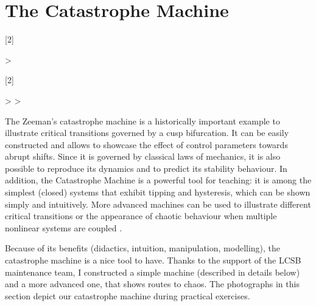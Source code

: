 
\chapter{The Catastrophe Machine}
\label{app:catasrophe}


\ifpdf
\graphicspath{{Appendix3/Figs/Raster/}{Appendix3/Figs/PDF/}{Appendix3/Figs/}}
\else
\graphicspath{{Appendix3/Figs/Vector/}{Appendix3/Figs/}}
\fi


\newcolumntype{P}[2]{%
	>{\begin{turn}{#1}\begin{minipage}{#2}\small\raggedright\hspace{0pt}}l%
			<{\end{minipage}\end{turn}}%
}
\newcolumntype{R}[2]{%
	>{}
	>{\begin{turn}{#1}\begin{minipage}{#2}\small\raggedright\hspace{0pt}}l%
			<{\end{minipage}\end{turn}}%
}



The Zeeman's catastrophe machine is a historically important example to illustrate critical transitions governed by a cusp bifurcation. It can be easily constructed and allows to showcase the effect of control parameters towards abrupt shifts. Since it is governed by classical laws of mechanics, it is also possible to reproduce its dynamics and to predict its stability behaviour. In addition, the Catastrophe Machine is a powerful tool for teaching: it is among the simplest (closed) systems that exhibit tipping and hysteresis, which can be shown simply and intuitively. More advanced machines can be used to illustrate different critical transitions \citep{woodcock1976higher} or the appearance of chaotic behaviour when multiple nonlinear systems are coupled \citep{nagy2013zeeman}.

Because of its benefits (didactics, intuition, manipulation, modelling), the catastrophe machine is a nice tool to have. Thanks to the support of the LCSB maintenance team, I constructed a simple machine (described in details below) and a more advanced one, that shows routes to chaos. The photographs in this section depict our catastrophe machine during practical exercises.




